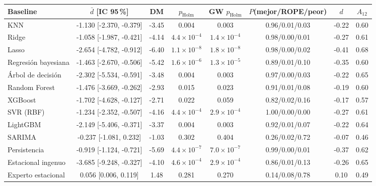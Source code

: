 \begin{tabular}{lccccccc}
\toprule
Baseline & $\bar d$ [IC 95\,\%] & DM & $p_{\mathrm{Holm}}$ & GW $p_{\mathrm{Holm}}$ & $P$(mejor/ROPE/peor) & $d$ & $A_{12}$ \\
\midrule
KNN & -1.130 [-2.370, -0.379] & -3.45 & 0.004 & 0.003 & 0.96/0.01/0.03 & -0.22 & 0.60 \\
Ridge & -1.058 [-1.987, -0.421] & -4.14 & $4.4\times10^{-4}$ & $1.4\times10^{-4}$ & 0.98/0.00/0.01 & -0.27 & 0.61 \\
Lasso & -2.654 [-4.782, -0.912] & -6.40 & $1.1\times10^{-8}$ & $1.8\times10^{-8}$ & 0.98/0.00/0.02 & -0.41 & 0.68 \\
Regresión bayesiana & -1.463 [-2.670, -0.506] & -5.42 & $1.6\times10^{-6}$ & $1.3\times10^{-5}$ & 0.89/0.01/0.10 & -0.35 & 0.60 \\
Árbol de decisión & -2.302 [-5.534, -0.591] & -3.48 & 0.004 & 0.003 & 0.97/0.00/0.03 & -0.22 & 0.65 \\
Random Forest & -1.476 [-3.669, -0.262] & -2.93 & 0.015 & 0.023 & 0.91/0.01/0.08 & -0.19 & 0.60 \\
XGBoost & -1.702 [-4.628, -0.127] & -2.71 & 0.022 & 0.059 & 0.82/0.02/0.16 & -0.17 & 0.57 \\
SVR (RBF) & -1.234 [-2.352, -0.507] & -4.16 & $4.4\times10^{-4}$ & $2.9\times10^{-4}$ & 1.00/0.00/0.00 & -0.27 & 0.61 \\
LightGBM & -2.149 [-5.406, -0.371] & -3.37 & 0.004 & 0.003 & 0.92/0.01/0.07 & -0.22 & 0.64 \\
SARIMA & -0.237 [-1.081, 0.232] & -1.03 & 0.302 & 0.404 & 0.26/0.02/0.72 & -0.07 & 0.46 \\
Persistencia & -0.919 [-1.124, -0.721] & -5.69 & $4.4\times10^{-7}$ & $7.0\times10^{-7}$ & 0.99/0.00/0.01 & -0.37 & 0.62 \\
Estacional ingenuo & -3.685 [-9.248, -0.327] & -4.10 & $4.6\times10^{-4}$ & $2.9\times10^{-4}$ & 0.86/0.01/0.13 & -0.26 & 0.65 \\
Experto estacional & 0.056 [0.006, 0.119] & 1.48 & 0.281 & 0.270 & 0.14/0.08/0.78 & 0.10 & 0.49 \\
\bottomrule
\end{tabular}